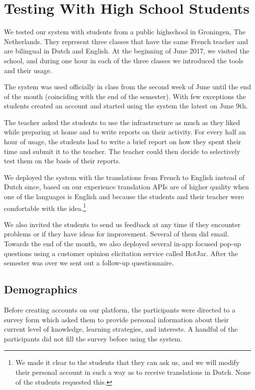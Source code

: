 
\newpage
\section{Testing With High School Students}
\label{sec:demographics}

We tested our system with \stcnt students from a public highschool in Groningen, The Netherlands. They represent three classes that have the same French teacher and are bilingual in Dutch and English. At the beginning of June 2017, we visited the school, and during one hour in each of the three classes we introduced the tools and their usage.

The system was used officially in class from the second week of June until the end of the month (coinciding with the end of the semester). With few exceptions the students created an account and started using the system the latest on June 9th. 

The teacher asked the students to use the infrastructure as much as they liked while preparing at home and to write reports on their activity. For every half an hour of usage, the students had to write a brief report on how they spent their time and submit it to the teacher. The teacher could then decide to selectively test them on the basis of their reports.

We deployed the system with the translations from French to English instead of Dutch since, based on our experience translation APIs are of higher quality when one of the languages is English and because the students and their teacher were comfortable with the idea.\footnote{We made it clear to the students that they can ask us, and we will modify their personal account in such a way as to receive translations in Dutch. None of the students requested this.}

We also invited the students to send us feedback at any time if they encounter problems or if they have ideas for improvement. Several of them did email. Towards the end of the month, we also deployed several in-app focused pop-up questions using a customer opinion elicitation service called HotJar. After the semester was over we sent out a follow-up questionnaire.

\subsection{Demographics}

Before creating accounts on our platform, the participants were directed to a survey form which asked them to provide personal information about their current level of knowledge, learning strategies, and interests. A handful of the participants did not fill the survey before using the system.

